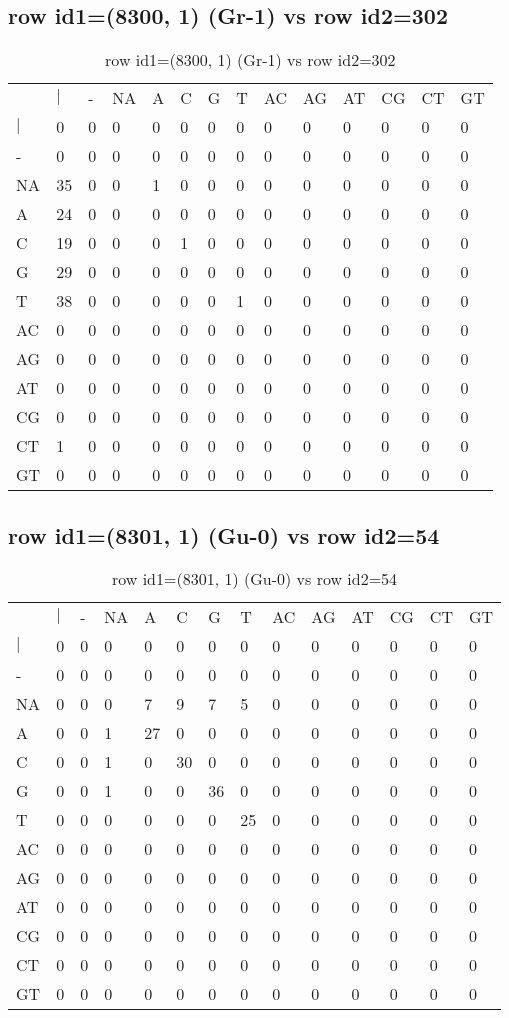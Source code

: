 \subsection{row id1=(8300, 1) (Gr-1) vs row id2=302}
\begin{center}
\begin{longtable}{|l|l|l|l|l|l|l|l|l|l|l|l|l|l|}
\caption{row id1=(8300, 1) (Gr-1) vs row id2=302} \label{table_dm284}\\
\hline
\\
\hline
&$|$&-&NA&A&C&G&T&AC&AG&AT&CG&CT&GT\\
$|$&0&0&0&0&0&0&0&0&0&0&0&0&0\\
-&0&0&0&0&0&0&0&0&0&0&0&0&0\\
NA&35&0&0&1&0&0&0&0&0&0&0&0&0\\
A&24&0&0&0&0&0&0&0&0&0&0&0&0\\
C&19&0&0&0&1&0&0&0&0&0&0&0&0\\
G&29&0&0&0&0&0&0&0&0&0&0&0&0\\
T&38&0&0&0&0&0&1&0&0&0&0&0&0\\
AC&0&0&0&0&0&0&0&0&0&0&0&0&0\\
AG&0&0&0&0&0&0&0&0&0&0&0&0&0\\
AT&0&0&0&0&0&0&0&0&0&0&0&0&0\\
CG&0&0&0&0&0&0&0&0&0&0&0&0&0\\
CT&1&0&0&0&0&0&0&0&0&0&0&0&0\\
GT&0&0&0&0&0&0&0&0&0&0&0&0&0\\
\hline
\end{longtable}
\end{center}

\subsection{row id1=(8301, 1) (Gu-0) vs row id2=54}
\begin{center}
\begin{longtable}{|l|l|l|l|l|l|l|l|l|l|l|l|l|l|}
\caption{row id1=(8301, 1) (Gu-0) vs row id2=54} \label{table_dm286}\\
\hline
\\
\hline
&$|$&-&NA&A&C&G&T&AC&AG&AT&CG&CT&GT\\
$|$&0&0&0&0&0&0&0&0&0&0&0&0&0\\
-&0&0&0&0&0&0&0&0&0&0&0&0&0\\
NA&0&0&0&7&9&7&5&0&0&0&0&0&0\\
A&0&0&1&27&0&0&0&0&0&0&0&0&0\\
C&0&0&1&0&30&0&0&0&0&0&0&0&0\\
G&0&0&1&0&0&36&0&0&0&0&0&0&0\\
T&0&0&0&0&0&0&25&0&0&0&0&0&0\\
AC&0&0&0&0&0&0&0&0&0&0&0&0&0\\
AG&0&0&0&0&0&0&0&0&0&0&0&0&0\\
AT&0&0&0&0&0&0&0&0&0&0&0&0&0\\
CG&0&0&0&0&0&0&0&0&0&0&0&0&0\\
CT&0&0&0&0&0&0&0&0&0&0&0&0&0\\
GT&0&0&0&0&0&0&0&0&0&0&0&0&0\\
\hline
\end{longtable}
\end{center}

